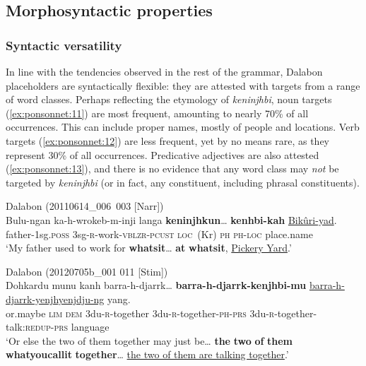 \documentclass[output=paper]{langscibook}
\begin{document}
\subsection{Morphosyntactic properties} 
\label{sec:ponsonnet:3.2}
\subsubsection{Syntactic versatility}
\label{sec:ponsonnet:3.2.1}
In line with the tendencies observed in the rest of the grammar, Dalabon placeholders are syntactically flexible: they are attested with targets from a range of word classes. Perhaps reflecting the etymology of \textit{keninjhbi}, noun targets (\ref{ex:ponsonnet:11}) are most frequent, amounting to nearly 70\% of all occurrences. This can include proper names, mostly of people and locations. Verb targets (\ref{ex:ponsonnet:12}) are less frequent, yet by no means rare, as they represent 30\% of all occurrences. Predicative adjectives are also attested (\ref{ex:ponsonnet:13}), and there is no evidence that any word class may \textit{not} be targeted by \textit{keninjhbi} (or in fact, any constituent, including phrasal constituents).

\ea
{\label{ex:ponsonnet:11}Dalabon (20110614\_006~003 [Narr])}\\
\gll Bulu-ngan     ka-h-wrokeb-m-inji langa         \textbf{keninjhkun}… \textbf{kenhbi-kah}   \uline{Bikûri-yad}.\\
father-1sg.\textsc{poss}    3sg-\textsc{r}{}-work-\textsc{vblzr-pcust} {\textsc{loc}~\textup{(Kr)}} \textsc{ph} \textsc{ph}\textup{-}\textsc{loc} \textup{place.name}\\
\glt ‘My father used to work for \textbf{whatsit}… \textbf{at} \textbf{whatsit}, \uline{Pickery Yard}.’
\z 


\ea
{\label{ex:ponsonnet:12}Dalabon (20120705b\_001 011 [Stim])}\\
\gll Dohkardu  munu   kanh  barra-h-djarrk… \textbf{barra-h-djarrk-kenjhbi-mu} \uline{barra-h-djarrk-yenjhyenjdju-ng}   yang.\\
\textup{or.maybe} \textsc{lim} \textsc{dem} \textup{3du-}\textsc{r}\textup{{}-together} \textup{3du-}\textsc{r}\textup{{}-together}\textsc{{}-ph}\textup{{}-}\textsc{prs} \textup{3du-}\textsc{r}\textup{{}-together-talk:}\textsc{redup-prs} \textup{language}\\
\glt ‘Or else the two of them together may just be… \textbf{the} \textbf{two} \textbf{of} \textbf{them} \textbf{whatyoucallit} \textbf{together}… \uline{the two of them are talking together}.’
\z 
\end{document}
